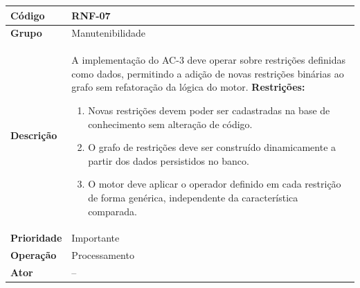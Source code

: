 \FloatBarrier
\begin{quadro}[htb]
  \caption{RNF-07 -- Motor de inferência expansível para novas restrições}
  \label{quad:rnf07}
  \begin{tabular}{|p{3.2cm}|p{11.8cm}|}
    \hline
    \textbf{Código}     & RNF-07                                                                                                   \\ \hline
    \textbf{Grupo}      & Manutenibilidade                                                                                         \\ \hline
    \textbf{Descrição}  &
    A implementação do AC-3 deve operar sobre restrições definidas como dados, permitindo a adição de novas restrições binárias ao grafo sem refatoração da lógica do motor.
    \textbf{Restrições:}
    \begin{enumerate}[nosep,leftmargin=1.2em,topsep=2pt,partopsep=0pt,parsep=0pt,itemsep=1pt]
      \item Novas restrições devem poder ser cadastradas na base de conhecimento sem alteração de código.
      \item O grafo de restrições deve ser construído dinamicamente a partir dos dados persistidos no banco.
      \item O motor deve aplicar o operador definido em cada restrição de forma genérica, independente da característica comparada.
    \end{enumerate} \\ \hline
    \textbf{Prioridade} & Importante                                                                                               \\ \hline
    \textbf{Operação}   & Processamento                                                                                            \\ \hline
    \textbf{Ator}       & --                                                                                                       \\ \hline
  \end{tabular}
\end{quadro}

